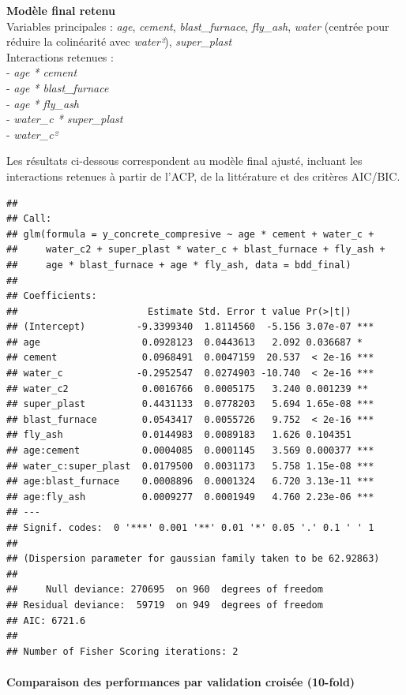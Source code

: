 \documentclass[
  12pt,
]{article}
\begin{document}
\textbf{Modèle final retenu}\\
Variables principales : \emph{age}, \emph{cement},
\emph{blast\_furnace}, \emph{fly\_ash}, \emph{water} (centrée pour
réduire la colinéarité avec \emph{water²}), \emph{super\_plast}\\
Interactions retenues :\\
- \emph{age * cement}\\
- \emph{age * blast\_furnace}\\
- \emph{age * fly\_ash}\\
- \emph{water\_c * super\_plast}\\
- \emph{water\_c²}

Les résultats ci-dessous correspondent au modèle final ajusté, incluant
les interactions retenues à partir de l'ACP, de la littérature et des
critères AIC/BIC.

\begin{verbatim}
## 
## Call:
## glm(formula = y_concrete_compresive ~ age * cement + water_c + 
##     water_c2 + super_plast * water_c + blast_furnace + fly_ash + 
##     age * blast_furnace + age * fly_ash, data = bdd_final)
## 
## Coefficients:
##                       Estimate Std. Error t value Pr(>|t|)    
## (Intercept)         -9.3399340  1.8114560  -5.156 3.07e-07 ***
## age                  0.0928123  0.0443613   2.092 0.036687 *  
## cement               0.0968491  0.0047159  20.537  < 2e-16 ***
## water_c             -0.2952547  0.0274903 -10.740  < 2e-16 ***
## water_c2             0.0016766  0.0005175   3.240 0.001239 ** 
## super_plast          0.4431133  0.0778203   5.694 1.65e-08 ***
## blast_furnace        0.0543417  0.0055726   9.752  < 2e-16 ***
## fly_ash              0.0144983  0.0089183   1.626 0.104351    
## age:cement           0.0004085  0.0001145   3.569 0.000377 ***
## water_c:super_plast  0.0179500  0.0031173   5.758 1.15e-08 ***
## age:blast_furnace    0.0008896  0.0001324   6.720 3.13e-11 ***
## age:fly_ash          0.0009277  0.0001949   4.760 2.23e-06 ***
## ---
## Signif. codes:  0 '***' 0.001 '**' 0.01 '*' 0.05 '.' 0.1 ' ' 1
## 
## (Dispersion parameter for gaussian family taken to be 62.92863)
## 
##     Null deviance: 270695  on 960  degrees of freedom
## Residual deviance:  59719  on 949  degrees of freedom
## AIC: 6721.6
## 
## Number of Fisher Scoring iterations: 2
\end{verbatim}

\paragraph{Comparaison des performances par validation croisée
(10-fold)}\label{comparaison-des-performances-par-validation-croisuxe9e-10-fold}
\end{document}
